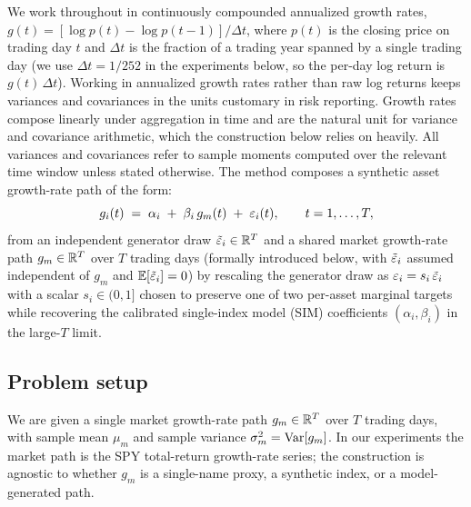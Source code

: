 
We work throughout in continuously compounded annualized growth rates,
$g(t) = [\log p(t) - \log p(t-1)] / \Delta t$, where $p(t)$ is the
closing price on trading day $t$ and $\Delta t$ is the fraction of a
trading year spanned by a single trading day (we use
$\Delta t = 1/252$ in the experiments below, so the per-day log return
is $g(t)\,\Delta t$). Working in annualized growth rates rather than
raw log returns keeps variances and covariances in the units customary
in risk reporting. Growth rates compose linearly under aggregation in time and are the natural
unit for variance and covariance arithmetic, which the construction
below relies on heavily. All variances and covariances refer to
sample moments computed over the relevant time window unless stated
otherwise. The method composes a synthetic asset growth-rate path of
the form:
\begin{equation}
  g_i(t) \;=\; \alpha_i \;+\; \beta_i\, g_m(t) \;+\; \varepsilon_i(t),
  \qquad t = 1,\dots,T,
  \label{eq:sim-composition}
\end{equation}
from an independent generator draw $\tilde{\varepsilon}_i \in \mathbb{R}^T$ and a shared
market growth-rate path $g_m \in \mathbb{R}^T$ over $T$ trading days
(formally introduced below, with $\tilde{\varepsilon}_i$ assumed independent of
$g_m$ and $\mathbb{E}[\tilde{\varepsilon}_i] = 0$) by
rescaling the generator draw as $\varepsilon_i = s_i\,\tilde{\varepsilon}_i$ with a
scalar $s_i \in (0,1]$ chosen to preserve one of two per-asset
marginal targets while recovering the calibrated single-index
model (SIM) coefficients $(\alpha_i, \beta_i)$ in the large-$T$
limit.

\subsection{Problem setup}
\label{sec:method-setup}

We are given a single market growth-rate path $g_m \in \mathbb{R}^T$ over $T$
trading days, with sample mean $\mu_m$ and sample variance
$\sigma_m^2 = \operatorname{Var}[g_m]$. In our experiments the market path is the
SPY total-return growth-rate series; the construction is agnostic to
whether $g_m$ is a single-name proxy, a synthetic index, or a
model-generated path.

